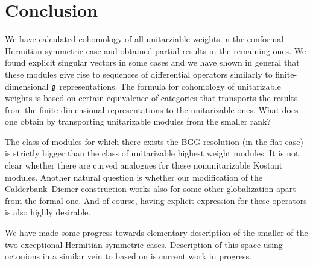 \chapter*{Conclusion}

We have calculated cohomology of all unitarziable weights in the conformal Hermitian symmetric case and obtained partial results in the remaining ones. We found explicit singular vectors in some cases and we have shown in general that these modules give rise to sequences of differential operators similarly to finite-dimensional $\mathfrak{g}$ representations. The formula for cohomology of unitarizable weights is based on certain equivalence of categories that transports the results from the finite-dimensional representations to the unitarizable ones. What does one obtain by transporting unitarizable modules from the smaller rank? 

The class of modules for which there exists the BGG resolution (in the flat case) is strictly bigger than the class of unitarizable highest weight modules. It is not clear whether there are curved analogues for these nonunitarizable Kostant modules. Another natural question is whether our modification of the Calderbank--Diemer construction works also for some other globalization apart from the formal one. And of course, having explicit expression for these operators is also highly desirable. 

We have made some progress towards elementary description of the smaller of the two exceptional Hermitian symmetric cases. Description of this space using octonions in a similar vein to \cite{pazourek_hyperplane_2011} based on \cite{baez_supersymmetry} is current work in progress. 

